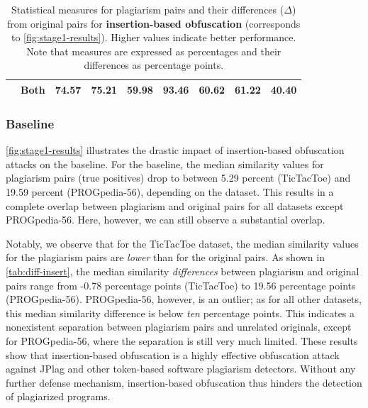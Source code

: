 \begin{table}[h]
\begin{tabular}{lrrrrrrrr}
		                               & Both     & \textbf{74.57}      & \textbf{75.21}     & \textbf{59.98}      & \textbf{93.46}      & \textbf{60.62}         & \textbf{61.22}           & \textbf{40.40}        \\  
		\bottomrule  
	\end{tabular}
	\caption[Evaluation Results: Insertion-based Obfuscation]{Statistical measures for plagiarism pairs and their differences ($\Delta$) from original pairs for \textbf{insertion-based obfuscation} (corresponds to \autoref{fig:stage1-results}). Higher values indicate better performance. Note that measures are expressed as percentages and their differences as percentage points.}
	\label{tab:diff-insert}
\end{table}



 


\subsubsection{Baseline}
\autoref{fig:stage1-results} illustrates the drastic impact of insertion-based obfuscation attacks on the baseline.
For the baseline, the median similarity values for plagiarism pairs (true positives) drop to between 5.29 percent (TicTacToe) and 19.59 percent (PROGpedia-56), depending on the dataset.
This results in a complete overlap between plagiarism and original pairs for all datasets except PROGpedia-56. Here, however, we can still observe a substantial overlap.

Notably, we observe that for the TicTacToe dataset, the median similarity values for the plagiarism pairs are \textit{lower} than for the original pairs.
As shown in \autoref{tab:diff-insert}, the median similarity \textit{differences} between plagiarism and original pairs range from -0.78 percentage points (TicTacToe) to 19.56 percentage points (PROGpedia-56). PROGpedia-56, however, is an outlier; as for all other datasets, this median similarity difference is below \textit{ten} percentage points. This indicates a nonexistent separation between plagiarism pairs and unrelated originals, except for PROGpedia-56, where the separation is still very much limited.
These results show that insertion-based obfuscation is a highly effective obfuscation attack against JPlag and other token-based software plagiarism detectors.
Without any further defense mechanism, insertion-based obfuscation thus hinders the detection of plagiarized programs.

